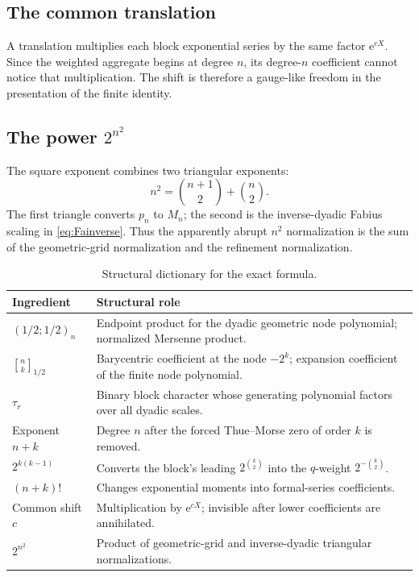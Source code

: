 \documentclass[11pt,oneside]{article}
\theoremstyle{definition}
\theoremstyle{remark}
\newcommand{\qpoch}[3]{\left(#1;#2\right)_{#3}}
\newcommand{\halfqbinom}[2]{{\genfrac{[}{]}{0pt}{}{#1}{#2}}_{1/2}}
\newcommand{\e}{\mathrm e}
\newcommand{\tm}{\tau}
\begin{document}
\subsection{The common translation}

A translation multiplies each block exponential series by the same factor
$\e^{cX}$.  Since the weighted aggregate begins at degree $n$, its degree-$n$
coefficient cannot notice that multiplication.  The shift is therefore a
gauge-like freedom in the presentation of the finite identity.

\subsection{The power \texorpdfstring{$2^{n^2}$}{2 to the n-squared}}

The square exponent combines two triangular exponents:
\begin{equation}\label{eq:squaresplit}
 n^2=\binom{n+1}{2}+\binom n2.
\end{equation}
The first triangle converts $p_n$ to $M_n$; the second is the inverse-dyadic
Fabius scaling in \eqref{eq:Fainverse}.  Thus the apparently abrupt $n^2$
normalization is the sum of the geometric-grid normalization and the
refinement normalization.

\begin{table}[H]
\centering
\caption{Structural dictionary for the exact formula.}
\label{tab:roles}
\begin{tabularx}{\textwidth}{@{}>{\raggedright\arraybackslash}p{}X@{}}
\toprule
Ingredient & Structural role\\
\midrule
$\qpoch{1/2}{1/2}{n}$ & Endpoint product for the dyadic geometric node polynomial; normalized Mersenne product.\\
$\halfqbinom{n}{k}$ & Barycentric coefficient at the node $-2^k$; expansion coefficient of the finite node polynomial.\\
$\tm_r$ & Binary block character whose generating polynomial factors over all dyadic scales.\\
Exponent $n+k$ & Degree $n$ after the forced Thue--Morse zero of order $k$ is removed.\\
$2^{k(k-1)}$ & Converts the block's leading $2^{\binom{k}{2}}$ into the $q$-weight $2^{-\binom{k}{2}}$.\\
$(n+k)!$ & Changes exponential moments into formal-series coefficients.\\
Common shift $c$ & Multiplication by $\e^{cX}$; invisible after lower coefficients are annihilated.\\
$2^{n^2}$ & Product of geometric-grid and inverse-dyadic triangular normalizations.\\
\bottomrule
\end{tabularx}
\end{table}
\end{document}
